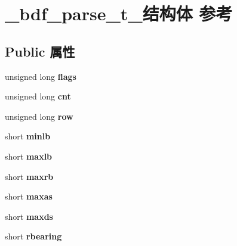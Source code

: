 \hypertarget{struct__bdf__parse__t__}{}\section{\+\_\+bdf\+\_\+parse\+\_\+t\+\_\+结构体 参考}
\label{struct__bdf__parse__t__}
\subsection*{Public 属性}
\begin{DoxyCompactItemize}
\item 
\mbox{\label{struct__bdf__parse__t___a6b542a4fbc88c16d9ed9bf3a411cab3b}} 
unsigned long {\bfseries flags}
\item 
\mbox{\label{struct__bdf__parse__t___a5b04ea4c7b7217a49ec9b3acf40e6e15}} 
unsigned long {\bfseries cnt}
\item 
\mbox{\label{struct__bdf__parse__t___aad65e1b83bcdb3cdc7e7a277b8294590}} 
unsigned long {\bfseries row}
\item 
\mbox{\label{struct__bdf__parse__t___a723f13d25c321ecf08ebdacbbc21c4df}} 
short {\bfseries minlb}
\item 
\mbox{\label{struct__bdf__parse__t___a5d16e1b687ad6f596a552a13531a8157}} 
short {\bfseries maxlb}
\item 
\mbox{\label{struct__bdf__parse__t___a3570ced872e6588430c9402b6ab5390f}} 
short {\bfseries maxrb}
\item 
\mbox{\label{struct__bdf__parse__t___a036f466e7b3415dabac8b25946985c09}} 
short {\bfseries maxas}
\item 
\mbox{\label{struct__bdf__parse__t___a133150b5871fe65f9a478cde988cdaa0}} 
short {\bfseries maxds}
\item 
\mbox{\label{struct__bdf__parse__t___a7f8f18be68f734a025894a2965e10d39}} 
short {\bfseries rbearing}
\item 

\end{DoxyCompactItemize}

